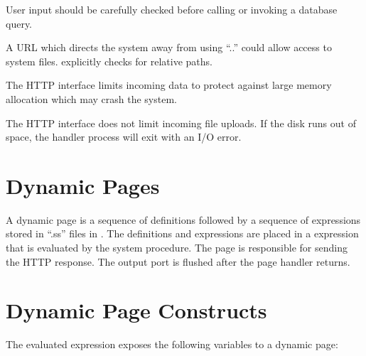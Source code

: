 User input should be carefully checked before calling  or
invoking a database query.

A URL which directs the system away from  using
``..'' could allow access to system files. 
explicitly checks for relative paths.

The HTTP interface limits incoming data to protect against large
memory allocation which may crash the system.

The HTTP interface does not limit incoming file uploads. If the disk
runs out of space, the handler process will exit with an I/O error.

\section {Dynamic Pages}

A dynamic page is a sequence of definitions followed by a sequence of
expressions stored in ``.ss'' files in .  The
definitions and expressions are placed in a  expression
that is evaluated by the  system procedure.  The
page is responsible for sending the HTTP response. The output port is
flushed after the page handler returns.

\section {Dynamic Page Constructs}

The evaluated  expression exposes the following
variables to a dynamic page:

\begin{argtbl}
\end{argtbl}

\begin{syntax}
\end{syntax}\antipar
{}

\begin{syntax}
\end{syntax}\antipar
{}

